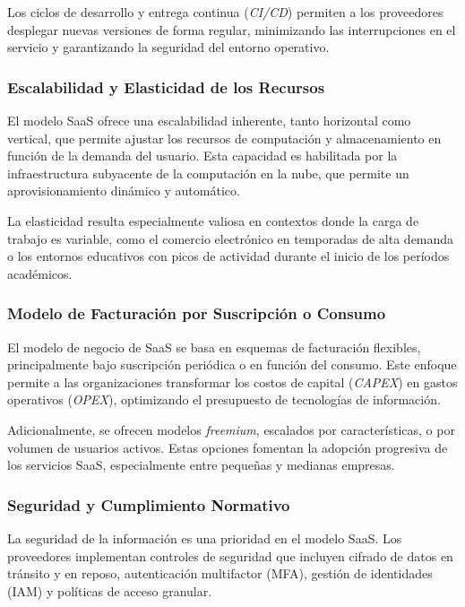 {                Los ciclos de desarrollo y entrega continua (\textit{CI/CD}) permiten a los proveedores desplegar nuevas versiones de forma regular, minimizando las interrupciones en el servicio y garantizando la seguridad del entorno operativo.
                
            \subsubsection{Escalabilidad y Elasticidad de los Recursos}
                El modelo SaaS ofrece una escalabilidad inherente, tanto horizontal como vertical, que permite ajustar los recursos de computación y almacenamiento en función de la demanda del usuario. Esta capacidad es habilitada por la infraestructura subyacente de la computación en la nube, que permite un aprovisionamiento dinámico y automático.
                
                La elasticidad resulta especialmente valiosa en contextos donde la carga de trabajo es variable, como el comercio electrónico en temporadas de alta demanda o los entornos educativos con picos de actividad durante el inicio de los períodos académicos.
                
            \subsubsection{Modelo de Facturación por Suscripción o Consumo}
                El modelo de negocio de SaaS se basa en esquemas de facturación flexibles, principalmente bajo suscripción periódica o en función del consumo. Este enfoque permite a las organizaciones transformar los costos de capital (\textit{CAPEX}) en gastos operativos (\textit{OPEX}), optimizando el presupuesto de tecnologías de información.
        
                Adicionalmente, se ofrecen modelos \textit{freemium}, escalados por características, o por volumen de usuarios activos. Estas opciones fomentan la adopción progresiva de los servicios SaaS, especialmente entre pequeñas y medianas empresas.
        
            \subsubsection{Seguridad y Cumplimiento Normativo}
                La seguridad de la información es una prioridad en el modelo SaaS. Los proveedores implementan controles de seguridad que incluyen cifrado de datos en tránsito y en reposo, autenticación multifactor (MFA), gestión de identidades (IAM) y políticas de acceso granular.
                
}
